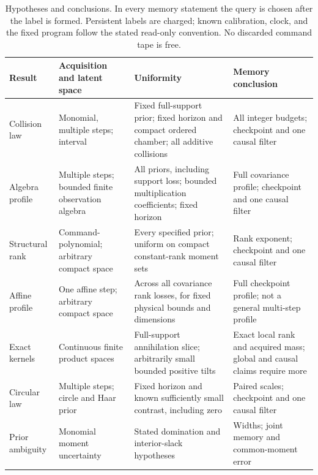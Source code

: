 \begin{table}[tbp]
\centering\footnotesize
\setlength{\tabcolsep}{4pt}
\begin{tabular}{@{}p{}p{}p{}p{}@{}}
\toprule
Result & Acquisition and latent space & Uniformity & Memory conclusion\\
\midrule
Collision law & Monomial, multiple steps; interval & Fixed full-support
prior; fixed horizon and compact ordered chamber; all additive collisions
& All integer budgets; checkpoint and one causal filter\\[3pt]
Algebra profile & Multiple steps; bounded finite observation algebra &
All priors, including support loss; bounded multiplication coefficients;
fixed horizon & Full covariance profile; checkpoint and one causal filter\\[3pt]
Structural rank & Command-polynomial; arbitrary compact space & Every
specified prior; uniform on compact constant-rank moment sets & Rank
exponent; checkpoint and one causal filter\\[3pt]
Affine profile & One affine step; arbitrary compact space & Across all
covariance rank losses, for fixed physical bounds and dimensions & Full
checkpoint profile; not a general multi-step profile\\[3pt]
Exact kernels & Continuous finite product spaces & Full-support
annihilation slice; arbitrarily small bounded positive tilts & Exact local
rank and acquired mass; global and causal claims require more\\[3pt]
Circular law & Multiple steps; circle and Haar prior & Fixed horizon and
known sufficiently small contrast, including zero & Paired scales;
checkpoint and one causal filter\\[3pt]
Prior ambiguity & Monomial moment uncertainty & Stated domination and
interior-slack hypotheses & Widths; joint memory and common-moment error\\
\bottomrule
\end{tabular}
\caption{Hypotheses and conclusions. In every memory statement the query
is chosen after the label is formed. Persistent labels are charged;
known calibration, clock, and the fixed program follow the stated
read-only convention. No discarded command tape is free.}
\label{tab:scope}
\end{table}
